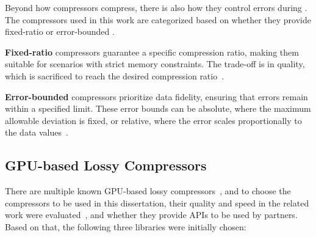 \documentclass[Ingles,Final]{ic-tese-v3}
\begin{document}
Beyond how compressors compress, there is also how they control errors during \compression. The compressors used in this work are categorized based on whether they provide fixed-ratio or error-bounded \compression. 

\textbf{Fixed-ratio} compressors guarantee a specific compression ratio, making them suitable for scenarios with strict memory constraints. The trade-off is in quality, which is sacrificed to reach the desired compression ratio~\cite{di2025}. 

\textbf{Error-bounded} compressors prioritize data fidelity, ensuring that \compression errors remain within a specified limit. These error bounds can be absolute, where the maximum allowable deviation is fixed, or relative, where the error scales proportionally to the data values~\cite{di2025}.

\subsection{GPU-based Lossy Compressors}
\label{sec:gpubased_lossy}

There are multiple known GPU-based lossy compressors~\cite{di2025}, and to choose the compressors to be used in this dissertation, their quality and speed in the related work were evaluated~\cite{dmitriev2022,kukreja2020,shen2022,shen2023,barbosa2023}, and whether they provide APIs to be used by partners. Based on that, the following three libraries were initially chosen:
\end{document}

